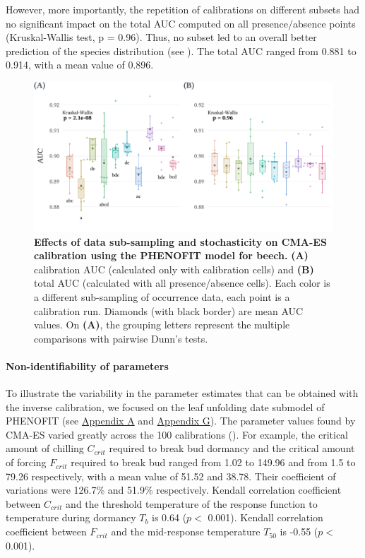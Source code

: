 However, more importantly, the repetition of calibrations on different
subsets had no significant impact on the total AUC computed on all
presence/absence points (Kruskal-Wallis test, p = 0.96). Thus, no subset
led to an overall better prediction of the species distribution (see
). The total AUC ranged from
0.881 to 0.914, with a mean value of 0.896. \newline

\begin{figure}[H]
\centering \includegraphics{chapter1/figs/cmaesrepAUCcal} 
\caption{\textbf{Effects of data sub-sampling and stochasticity on CMA-ES calibration using the PHENOFIT model for beech.} \textbf{(A)} calibration AUC (calculated only with calibration cells) and \textbf{(B)} total AUC (calculated with all presence/absence cells). Each color is a different sub-sampling of occurrence data, each point is a calibration run. Diamonds (with black border) are mean AUC values. On \textbf{(A)}, the grouping letters represent the multiple comparisons with pairwise Dunn’s tests.}\label{fig:cmaesrepAUCcal}
\end{figure}

\paragraph{Non-identifiability of
parameters}\label{non-identifiability-of-parameters}

To illustrate the variability in the parameter estimates that can be
obtained with the inverse calibration, we focused on the leaf unfolding
date submodel of PHENOFIT (see \hyperref[chap1:appendixA]{Appendix A}
and \hyperref[chap1:appendixG]{Appendix G}). The parameter values
found by CMA-ES varied greatly across the 100 calibrations
(). For example, the critical
amount of chilling \(C_{crit}\) required to break bud dormancy and the
critical amount of forcing \(F_{crit}\) required to break bud ranged
from 1.02 to 149.96 and from 1.5 to 79.26 respectively, with a mean
value of 51.52 and 38.78. Their coefficient of variations were 126.7\%
and 51.9\% respectively. Kendall correlation coefficient between
\(C_{crit}\) and the threshold temperature of the response function to
temperature during dormancy \(T_b\) is 0.64 (\(p <\) 0.001). Kendall
correlation coefficient between \(F_{crit}\) and the mid-response
temperature \(T_{50}\) is -0.55 (\(p <\) 0.001).

